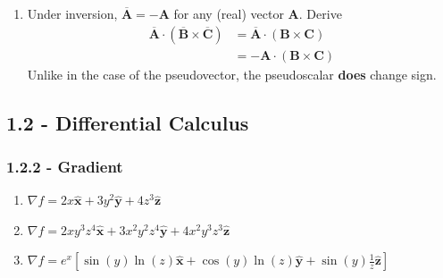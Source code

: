 \documentclass[a4paper]{article}
\begin{document}
\begin{enumerate}[label=(\alph*)]
	\[
		\pmb{v} = \pmb{\omega} \times \pmb{r} 
	\]
	where \( \pmb{\omega} \) is the angular velocity and \( \pmb{r} \) the radial vector. Now invert all of the vectors to derive:
	\[
		-\pmb{v} = \overline{\pmb{\omega}} \times \!\left( -\pmb{r} \right) = -\!\left( \overline{\pmb{\omega}} \times \pmb{r} \right) \quad \implies \pmb{v} = \overline{\pmb{\omega}} \times \pmb{r}
	\]
	We have demonstrated that \( \overline{\pmb{\omega}} = \pmb{\omega} \) under inversion, ascertaining its pseudovector quality. For angular momentum \( \pmb{L} \), recall that the definition
	\[
		\pmb{L} = \pmb{r} \times \pmb{p} 
	\]
	lends itself to our previous derivation of \( \overline{\pmb{A}} \times \overline{\pmb{B}} = \pmb{A} \times \pmb{B} \); simply replace the variables to see angular momentum is too a pseudovector.
	\item Under inversion, \( \overline{\pmb{A}} = -\pmb{A} \) for any (real) vector \( \pmb{A} \). Derive
	\begin{align*}
		\overline{\pmb{A}} \cdot \!\left( \overline{\pmb{B}} \times \overline{\pmb{C}} \right) & = \overline{\pmb{A}} \cdot \!\left( \pmb{B} \times \pmb{C} \right) \\
		 & = -\pmb{A} \cdot \!\left( \pmb{B} \times \pmb{C} \right)
	\end{align*}
	Unlike in the case of the pseudovector, the pseudoscalar \textbf{does} change sign.
\end{enumerate}

\newpage

\subsection{\textsf{1.2 - Differential Calculus}}
\subsubsection{\textsf{1.2.2 - Gradient}}

\begin{enumerate}[label=(\alph*)]
	\item \( \nabla f = 2x \pmb{\hat{x}} + 3y^{2} \pmb{\hat{y}} + 4z^{3} \pmb{\hat{z}} \)
	\item \( \nabla f = 2xy^{3}z^{4} \pmb{\hat{x}} + 3x^{2}y^{2}z^{4} \pmb{\hat{y}} + 4x^{2}y^{3}z^{3} \pmb{\hat{z}} \)
	\item \( \nabla f = e^{x}\!\left[ \sin\!\left(y\right)\ln\!\left(z\right)\pmb{\hat{x}} + \cos\!\left(y\right)\ln\!\left(z\right)\pmb{\hat{y}} + \sin\!\left(y\right)\frac{1}{z}\pmb{\hat{z}} \right] \)
\end{enumerate}
\end{document}

